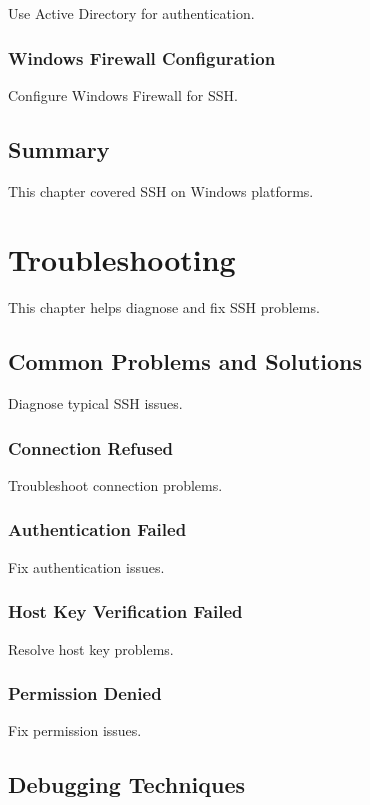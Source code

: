 \documentclass[12pt]{book}
\begin{document}
Use Active Directory for authentication.

\subsection{Windows Firewall Configuration}

Configure Windows Firewall for SSH.

\section{Summary}

This chapter covered SSH on Windows platforms.

\chapter{Troubleshooting}

This chapter helps diagnose and fix SSH problems.

\section{Common Problems and Solutions}

Diagnose typical SSH issues.

\subsection{Connection Refused}

Troubleshoot connection problems.

\subsection{Authentication Failed}

Fix authentication issues.

\subsection{Host Key Verification Failed}

Resolve host key problems.

\subsection{Permission Denied}

Fix permission issues.

\section{Debugging Techniques}
\end{document}
